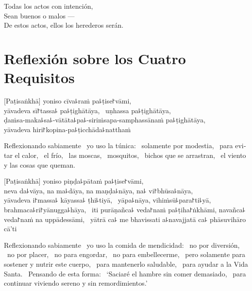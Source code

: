 Todas los actos con intención,\\
Sean buenos o malos ---\\
De estos actos, ellos los herederos serán.

\chapter[Cuatro Requisitos]{Reflexión sobre los Cuatro Requisitos}


\begin{leader}
\end{leader}

[Paṭisaṅkhā] yoniso cīva꜕raṁ pa꜕ṭise꜓vāmi, \pause\\
yāvadeva sī꜓tassa꜕ pa꜕ṭighātāya, \pause\ uṇhassa pa꜕ṭighātāya, \pause\\
ḍaṁsa-maka꜕sa꜕-vātāta꜕pa꜕-siriṁsapa-samphassānaṁ pa꜕ṭighātāya, \pause\\
yāvadeva hiri꜓kopina-pa꜕ṭicchāda꜕natthaṁ

\begin{english}
  Reflexionando sabiamente \pause\ yo uso la túnica: \pause\ solamente por modestia, \pause\
  para evitar el calor, \pause\ el frío, \pause\ las moscas, \pause\ mosquitos,
  \pause\ bichos que se arrastran, \pause\ el viento y las cosas que queman.
\end{english}

[Paṭisaṅkhā] yoniso piṇḍa꜕pātaṁ pa꜕ṭise꜓vāmi, \pause\\
neva da꜕vāya, na ma꜕dāya, na maṇḍa꜕nāya, na꜕ vi꜓bhūsa꜕nāya, \pause\\
yāvadeva i꜓massa꜕ kāyassa꜕ ṭhi꜕tiyā, \pause\ yāpa꜕nāya, vihiṁsū꜕para꜓ti꜕yā, \pause\\
brahmaca꜕ri꜓yānugga꜕hāya, \pause\ iti purāṇañca꜕ veda꜓naṁ pa꜕ṭiha꜓ṅkhāmi,
navañca꜕ veda꜓naṁ na uppādessāmi, \pause\ yātrā ca꜕ me bhavissati a꜕navajjatā
ca꜕ phāsuvihāro cā'ti

\begin{english}
  Reflexionando sabiamente \pause\ yo uso la comida de mendicidad: \pause\ no por
  diversión, \pause\ no por placer, \pause\ no para engordar, \pause\ no para
  embellecerme, \pause\ pero solamente para sostener y nutrir este cuerpo, \pause\
  para mantenerlo saludable, \pause\ para ayudar a la Vida Santa. \pause\ Pensando
  de esta forma: \pause\ ‘Saciaré el hambre sin comer demasiado, \pause\ para continuar viviendo sereno y sin remordimientos.’ 
\end{english}

